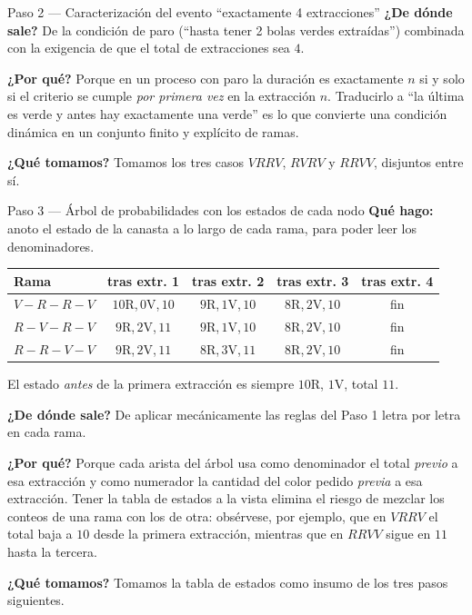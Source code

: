 \documentclass[11pt]{article}
\begin{document}
\begin{sol}
\begin{paso}{Paso 2 --- Caracterizaci\'on del evento ``exactamente 4 extracciones''}
\textbf{¿De d\'onde sale?} De la condici\'on de paro (``hasta tener 2 bolas verdes extra\'idas'') combinada con la exigencia de que el total de extracciones sea $4$.

\textbf{¿Por qu\'e?} Porque en un proceso con paro la duraci\'on es exactamente $n$ si y solo si el criterio se cumple \emph{por primera vez} en la extracci\'on $n$. Traducirlo a ``la \'ultima es verde y antes hay exactamente una verde'' es lo que convierte una condici\'on din\'amica en un conjunto finito y expl\'icito de ramas.

\textbf{¿Qu\'e tomamos?} Tomamos los tres casos $VRRV$, $RVRV$ y $RRVV$, disjuntos entre s\'i.
\end{paso}

\begin{paso}{Paso 3 --- \'Arbol de probabilidades con los estados de cada nodo}
\textbf{Qu\'e hago:} anoto el estado de la canasta a lo largo de cada rama, para poder leer los denominadores.

\begin{center}
\small\begin{tabular}{l|c|c|c|c}
Rama & tras extr. 1 & tras extr. 2 & tras extr. 3 & tras extr. 4\\\hline
$V\!-\!R\!-\!R\!-\!V$ & $10$R,\,$0$V,\,$10$ & $9$R,\,$1$V,\,$10$ & $8$R,\,$2$V,\,$10$ & fin\\
$R\!-\!V\!-\!R\!-\!V$ & $9$R,\,$2$V,\,$11$ & $9$R,\,$1$V,\,$10$ & $8$R,\,$2$V,\,$10$ & fin\\
$R\!-\!R\!-\!V\!-\!V$ & $9$R,\,$2$V,\,$11$ & $8$R,\,$3$V,\,$11$ & $8$R,\,$2$V,\,$10$ & fin
\end{tabular}
\end{center}
El estado \emph{antes} de la primera extracci\'on es siempre $10$R, $1$V, total $11$.

\textbf{¿De d\'onde sale?} De aplicar mec\'anicamente las reglas del Paso 1 letra por letra en cada rama.

\textbf{¿Por qu\'e?} Porque cada arista del \'arbol usa como denominador el total \emph{previo} a esa extracci\'on y como numerador la cantidad del color pedido \emph{previa} a esa extracci\'on. Tener la tabla de estados a la vista elimina el riesgo de mezclar los conteos de una rama con los de otra: obs\'ervese, por ejemplo, que en $VRRV$ el total baja a $10$ desde la primera extracci\'on, mientras que en $RRVV$ sigue en $11$ hasta la tercera.

\textbf{¿Qu\'e tomamos?} Tomamos la tabla de estados como insumo de los tres pasos siguientes.
\end{paso}


\end{sol}
\end{document}
